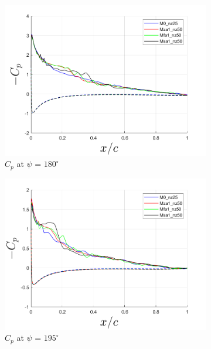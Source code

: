 \begin{figure}[H]
\centering

\begin{subfigure}[b]{0.475\textwidth}
\centering
\includegraphics[width=1\textwidth]{figures/Results/Cp_plots/Cp_ph_180.png}
\caption{ $C_p$ at $\psi$ = $180^\circ$}
\label{fig:Cp_180}
\end{subfigure}
\begin{subfigure}[b]{0.475\textwidth}
\centering
\includegraphics[width=1\textwidth]{figures/Results/Cp_plots/Cp_ph_195.png}
\caption{ $C_p$ at $\psi$ = $195^\circ$}
\label{fig:Cp_195}
\end{subfigure}
\begin{subfigure}[b]{0.475\textwidth}

\end{subfigure}
\end{figure}
